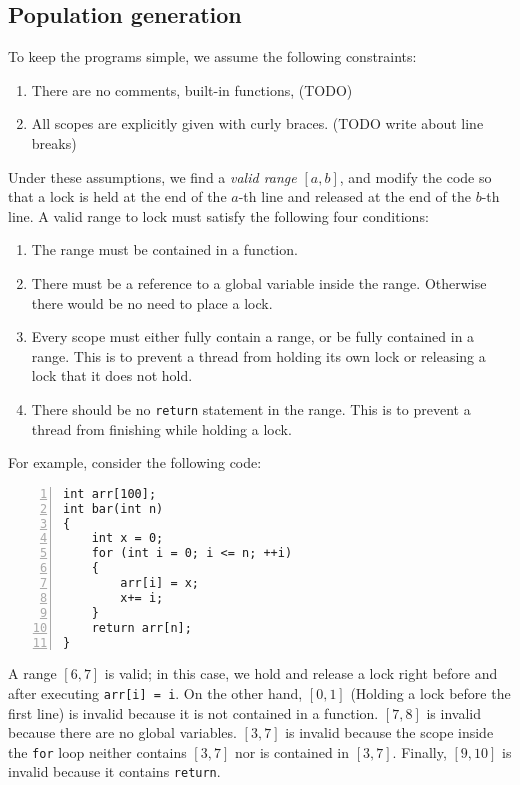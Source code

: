 \subsection{Population generation}

To keep the programs simple, we assume the following constraints:

\begin{enumerate}
    \item There are no comments, built-in functions, (TODO)
    \item All scopes are explicitly given with curly braces. (TODO write about line breaks)
\end{enumerate}

Under these assumptions, we find a \textit{valid range} $[a, b]$, and modify the code so that a lock is held at the end of the $a$-th line and released at the end of the $b$-th line. A valid range to lock must satisfy the following four conditions:

\begin{enumerate}
    \item The range must be contained in a function.
    \item There must be a reference to a global variable inside the range. Otherwise there would be no need to place a lock.
    \item Every scope must either fully contain a range, or be fully contained in a range. This is to prevent a thread from holding its own lock or releasing a lock that it does not hold.
    \item There should be no \verb|return| statement in the range. This is to prevent a thread from finishing while holding a lock.
\end{enumerate}

For example, consider the following code:


\begin{lstlisting}[frame=tb, xleftmargin=2em, framexleftmargin=1.5em, numbers=left]
int arr[100];
int bar(int n)
{
    int x = 0;
    for (int i = 0; i <= n; ++i)
    {
        arr[i] = x;
        x+= i;
    }
    return arr[n];
}
\end{lstlisting}

A range $[6, 7]$ is valid; in this case, we hold and release a lock right before and after executing \verb|arr[i] = i|. On the other hand, $[0, 1]$ (Holding a lock before the first line) is invalid because it is not contained in a function. $[7, 8]$ is invalid because there are no global variables. $[3, 7]$ is invalid because the scope inside the \verb|for| loop neither contains $[3, 7]$ nor is contained in $[3, 7]$. Finally, $[9, 10]$ is invalid because it contains \verb|return|.

